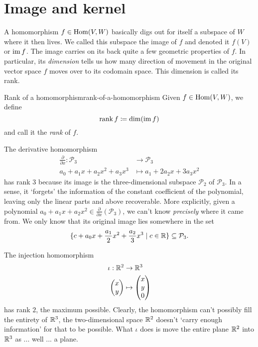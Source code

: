 \section{Image and kernel}
\label{sec:image-and-kernel}

A homomorphism $f \in \operatorname{Hom}(V,W)$ basically digs out for itself a subspace of $W$
where it then lives. We called this subspace the image of $f$ and denoted it
$f(V)$ or $\operatorname{im} f$. The image carries on its back quite a few geometric
properties of $f$. In particular, its \emph{dimension} tells us how many
direction of movement in the original vector space $f$ moves over to its
codomain space. This dimension is called its rank.

\begin{definition}{Rank of a homomorphism}{rank-of-a-homomorphism}
 Given $f \in \operatorname{Hom}(V,W)$, we define
 \[
  \operatorname{rank} f \coloneqq \dim(\operatorname{im} f)
 \]
 and call it the \emph{rank} of $f$.
\end{definition}
\begin{example}{}{}
 The derivative homomorphism
 \begin{align*}
  \frac{\partial }{\partial x}: \mathcal{P}_3 &\to \mathcal{P}_3\\
  a_0 + a_1x + a_2x^2 + a_3x^3 & \mapsto a_1 + 2a_2x + 3a_3x^2
 \end{align*}
 has rank $3$ because its image is the three-dimensional subspace
 $\mathcal{P}_2$ of $\mathcal{P}_3$. In a sense, it `forgets' the information of
 the constant coefficient of the polynomial, leaving only the linear parts and
 above recoverable. More explicitly, given a polynomial $a_0 + a_1x + a_2x^2 \in
 \frac{\partial }{\partial x}(\mathcal{P}_3)$, we can't know \emph{precisely}
 where it came from. We only know that its original image lies somewhere in the
 set
 \[
  \{c + a_0x + \frac{a_1}{2}x^2 + \frac{a_2}{3}x^3 \mid c \in \mathbb{R}\} \subseteq
  \mathcal{P}_3.
 \]
\end{example}
\begin{example}{}{}
 The injection homomorphism
 \begin{align*}
  \iota: \mathbb{R}^2 &\to \mathbb{R}^3\\
  \begin{pmatrix}
   x\\
   y
  \end{pmatrix}
              & \mapsto 
  \begin{pmatrix}
   x\\
   y\\
   0
  \end{pmatrix}
 \end{align*}
 has rank $2$, the maximum possible. Clearly, the homomorphism can't possibly
 fill the entirety of $\mathbb{R}^3$, the two-dimensional space $\mathbb{R}^2$ doesn't `carry
 enough information' for that to be possible. What $\iota$ does is move the
 entire plane $\mathbb{R}^2$ into $\mathbb{R}^3$ as ... well ... a plane.
\end{example}

